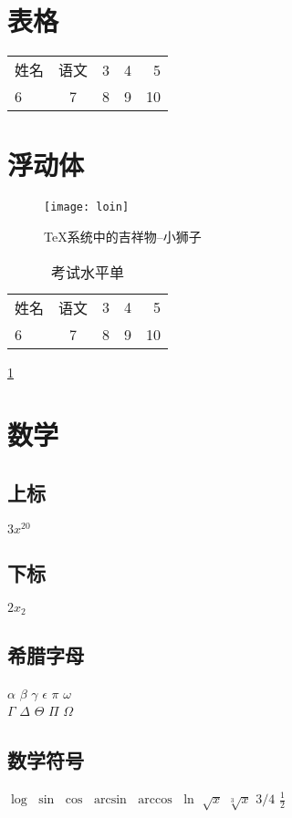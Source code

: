 \documentclass[10pt]{article} %
\begin{document}
	\section{表格} %
		\begin{tabular}{l | c || p{1.5cm} c r}
			\hline \hline%
			姓名 & 语文 & 3 & 4 & 5 \\
			6 & 7 & 8 & 9 & 10
		\end{tabular}
	\section{浮动体}
	\newpage
	\begin{figure}[htbp] %
		\centering %
		\texttt{[image: loin]}
		\caption{ \TeX 系统中的吉祥物--小狮子} \label{flg-lion}%
	\end{figure}
	\begin{table}[htbp]
		\begin{tabular}{l | c || p{1.5cm} c r}
			\hline \hline%
			姓名 & 语文 & 3 & 4 & 5 \\
			6 & 7 & 8 & 9 & 10
		\end{tabular}
		\caption{考试水平单}\ref{flg-lion} %
	\end{table}
	\section{数学}
	\subsection{上标}
	$3x^{20}$ %
	\subsection{下标}
	$2x_2$
	\subsection{希腊字母}
	$\alpha$
	$\beta$
	$\gamma$
	$\epsilon$
	$\pi$
	$\omega$
	\\
	$\Gamma$
	$\Delta$
	$\Theta$
	$\Pi$
	$\Omega$
	\subsection{数学符号}
	$\log$
	$\sin$
	$\cos$
	$\arcsin$
	$\arccos$
	$\ln$
	$\sqrt{x}$
	$\sqrt[3]{x}$
	$3/4$
	$\frac{1}{2}$
\end{document}
